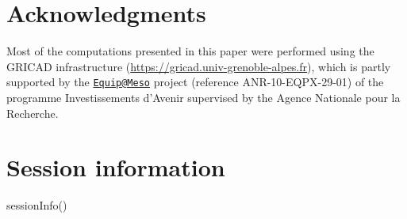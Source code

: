 \documentclass[
  11pt,
  english,
  ,doc,floatsintext]{apa6}
\newenvironment{Shaded}{}{}
\newcommand{\FunctionTok}[1]{\textcolor[rgb]{0.02,0.16,0.49}{#1}}
\newcommand{\NormalTok}[1]{#1}
\begin{document}
\newpage

\hypertarget{acknowledgments}{%
\section{Acknowledgments}\label{acknowledgments}}

Most of the computations presented in this paper were performed using the GRICAD infrastructure (\url{https://gricad.univ-grenoble-alpes.fr}), which is partly supported by the \href{mailto:Equip@Meso}{\nolinkurl{Equip@Meso}} project (reference ANR-10-EQPX-29-01) of the programme Investissements d'Avenir supervised by the Agence Nationale pour la Recherche.

\newpage

\hypertarget{session-information}{%
\section{Session information}\label{session-information}}

\begin{Shaded}
\begin{Highlighting}[]
\FunctionTok{sessionInfo}\NormalTok{()}
\end{Highlighting}
\end{Shaded}
\end{document}
